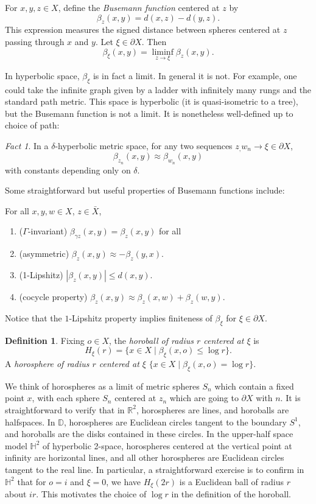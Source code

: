 \documentclass[11pt]{amsart}
\theoremstyle{plain}
\theoremstyle{definition}
\newtheorem{definition}[proposition]{Definition}
\theoremstyle{remark}
\newtheorem{fact}[proposition]{Fact}
\begin{document}
For $x,y,z\in X$, define the {\em Busemann function} centered at $z$ by 
\[
  \beta_z(x,y)=d(x,z)-d(y,z).
\]
This expression measures the signed distance between spheres centered at
$z$ passing through $x$ and $y$. 
Let $\xi\in \partial X$. Then 
\[
  \beta_\xi(x,y)=\liminf_{z\to\xi} \beta_z(x,y). 
\]

In hyperbolic space, $\beta_\xi$ is in fact a limit. In general it is not.
For example, one could take the infinite graph given by a ladder with
infinitely many rungs and the standard path metric. This space is 
hyperbolic (it is quasi-isometric to a tree), but the Busemann function is
not a limit. It is nonetheless well-defined up to choice of path:

\begin{fact}
  In a $\delta$-hyperbolic metric space, for any two sequences
  $z_,w_n\to\xi\in\partial X$, 
  \[
    \beta_{z_n}(x,y)\approx\beta_{w_n}(x,y)
  \]
  with constants depending only on $\delta$. 
\end{fact}

Some straightforward but useful 
properties of Busemann functions include:

For all $x,y,w\in X$, $z\in \bar{X}$, 
\begin{enumerate}
  \item ($\Gamma$-invariant) $\beta_{\gamma z}(x,y)=\beta_z(x,y)$ for all
  \item (asymmetric) $\beta_z (x,y) \approx -\beta_z(y,x)$. 
  \item (1-Lipshitz) $|\beta_z(x,y)|\leq d(x,y)$. 
  \item (cocycle property) $\beta_z(x,y)\approx
    \beta_z(x,w)+\beta_z(w,y)$.
\end{enumerate}

Notice that the $1$-Lipshitz property implies finiteness of $\beta_\xi$ for
$\xi\in\partial X$. 


\begin{definition}
  Fixing $o\in X$, the {\em horoball of radius $r$ centered at $\xi$} is 
  \[
    H_\xi(r)=\{x\in X\mid \beta_\xi(x,o)\leq \log r\}. 
  \]
  A {\em horosphere of radius $r$ centered at $\xi$} 
  $\{x\in X\mid \beta_\xi(x,o)=\log r\}. $
  \label{def:horoball}
\end{definition}


We think of horospheres
as a limit of metric spheres $S_n$
which contain a fixed point $x$, with each sphere $S_n$
centered at 
$z_n$ which are 
going to $\partial X$ with $n$.
It is straightforward to verify that in 
$\mathbb R^2$, horospheres are lines, and horoballs are 
halfspaces. In $\mathbb D$, horospheres are Euclidean circles tangent to
the boundary $S^1$, and horoballs are the disks contained in these circles.
In the upper-half space model $\mathbb H^2$ 
of hyperbolic 2-space, horospheres centered
at the vertical point at infinity are horizontal lines, and all other
horospheres are Euclidean circles tangent to the real line. In particular,
a straightforward exercise is to confirm in $\mathbb H^2$ that for $o=i$ and  $\xi=0$, we
have $H_\xi(2r)$ is a Euclidean ball of radius $r$ about $ir$. 
This motivates the choice of
$\log r$ in the definition of the horoball.
\end{document}
